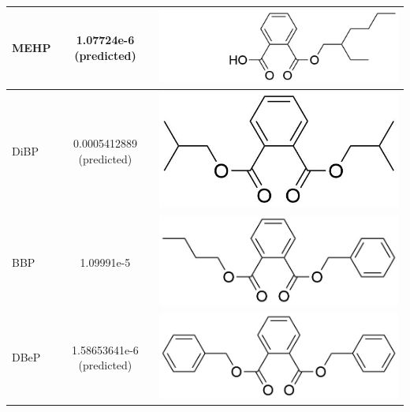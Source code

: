 \begin{table}
\begin{tabular}{lcc}
MEHP &  1.07724e-6 (predicted)  &  \begin{minipage}[c]{0.35\linewidth}\centering
\includegraphics[height=0.07\textheight]{pics/PH/MEHP_struct3.png}\end{minipage}\\ \midrule
DiBP &  0.0005412889 (predicted)   &  \begin{minipage}[c]{0.35\linewidth}\centering
\includegraphics[height=0.07\textheight]{pics/PH/DiBP_struct2.png}\end{minipage}\\ \midrule
BBP &   1.09991e-5  &  \begin{minipage}[c]{0.35\linewidth}\centering
\includegraphics[height=0.07\textheight]{pics/PH/BBP_struct2.png}\end{minipage}\\ \midrule
DBeP &  1.58653641e-6 (predicted)   &  \begin{minipage}[c]{0.35\linewidth}\centering
\includegraphics[height=0.07\textheight]{pics/PH/DBeP_struct2.png}\end{minipage}\\ \midrule

\end{tabular}
\end{table}
